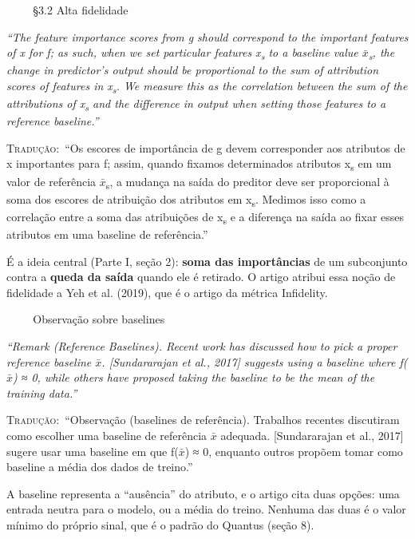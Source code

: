 \documentclass[11pt,a4paper]{article}
\newcommand{\pagechip}[1]{{\setlength{\fboxsep}{1.5pt}\colorbox{cAcc}{\textcolor{white}{\scriptsize\texttt{#1}}}}}
\newenvironment{origquote}{\par\itshape\small}{\par}
\newenvironment{tradquote}{\par\small\textsc{Tradução:}\ }{\par}
\newcommand{\explab}[1]{\par\smallskip{\small\color{cAcc}\textbf{\MakeUppercase{#1}}}\par}
\begin{document}
\begin{citacard}{\pagechip{p. 2} §3.2 Alta fidelidade}
\begin{origquote}“The feature importance scores from g should correspond to the important features of x for f; as such, when we set particular features x\textsubscript{s} to a baseline value \ensuremath{\bar{x}}\textsubscript{s}, the change in predictor’s output should be proportional to the sum of attribution scores of features in x\textsubscript{s}. We measure this as the correlation between the sum of the attributions of x\textsubscript{s} and the difference in output when setting those features to a reference baseline.”\end{origquote}
\begin{tradquote}“Os escores de importância de g devem corresponder aos atributos de x importantes para f; assim, quando fixamos determinados atributos x\textsubscript{s} em um valor de referência \ensuremath{\bar{x}}\textsubscript{s}, a mudança na saída do preditor deve ser proporcional à soma dos escores de atribuição dos atributos em x\textsubscript{s}. Medimos isso como a correlação entre a soma das atribuições de x\textsubscript{s} e a diferença na saída ao fixar esses atributos em uma baseline de referência.”\end{tradquote}
\explab{Explicação}
É a ideia central (Parte I, seção 2): \textbf{soma das importâncias} de um subconjunto contra a \textbf{queda da saída} quando ele é retirado. O artigo atribui essa noção de fidelidade a Yeh et al. (2019), que é o artigo da métrica Infidelity.
\end{citacard}

\begin{citacard}{\pagechip{p. 2} Observação sobre baselines}
\begin{origquote}“Remark (Reference Baselines). Recent work has discussed how to pick a proper reference baseline \ensuremath{\bar{x}}. [Sundararajan et al., 2017] suggests using a baseline where f(\ensuremath{\bar{x}}) ≈ 0, while others have proposed taking the baseline to be the mean of the training data.”\end{origquote}
\begin{tradquote}“Observação (baselines de referência). Trabalhos recentes discutiram como escolher uma baseline de referência \ensuremath{\bar{x}} adequada. [Sundararajan et al., 2017] sugere usar uma baseline em que f(\ensuremath{\bar{x}}) ≈ 0, enquanto outros propõem tomar como baseline a média dos dados de treino.”\end{tradquote}
\explab{Explicação}
A baseline representa a “ausência” do atributo, e o artigo cita duas opções: uma entrada neutra para o modelo, ou a média do treino. Nenhuma das duas é o valor mínimo do próprio sinal, que é o padrão do Quantus (seção 8).
\end{citacard}
\end{document}
